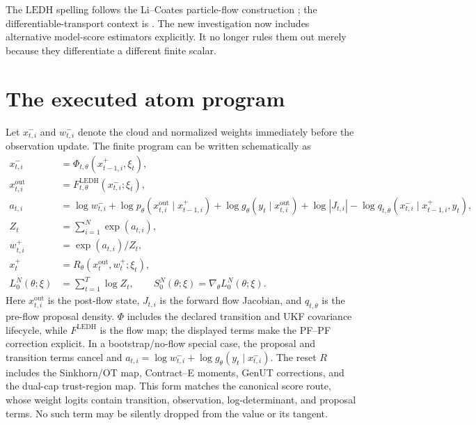 \documentclass[11pt]{article}
\newcommand{\LEDH}{\ensuremath{\mathrm{LEDH}}}
\newcommand{\GenUT}{\ensuremath{\mathrm{GenUT}}}
\newcommand{\OT}{\ensuremath{\mathrm{OT}}}
\begin{document}
The \LEDH{} spelling follows the Li--Coates particle-flow construction
\citep{li2017particle}; the differentiable-transport context is
\citet{corenflos2021differentiable}. The new investigation now includes
alternative model-score estimators explicitly. It no longer rules them out
merely because they differentiate a different finite scalar.


\section{The executed atom program}
\label{sec:atom}

Let $x_{t,i}^{-}$ and $w_{t,i}^{-}$ denote the cloud and normalized weights
immediately before the observation update.  The finite program can be written
schematically as
\begin{align}
 x_{t,i}^{-}
   &= \Phi_{t,\theta}(x_{t-1,i}^{+},\xi_t), \\
 x_{t,i}^{\mathrm{out}}
   &= F_{t,\theta}^{\mathrm{LEDH}}(x_{t,i}^{-};\xi_t), \\
 a_{t,i}
   &= \log w_{t,i}^{-}
      +\log p_\theta(x_{t,i}^{\mathrm{out}}\mid x_{t-1,i}^{+})
      +\log g_\theta(y_t\mid x_{t,i}^{\mathrm{out}})
      +\log |J_{t,i}|
      -\log q_{t,\theta}(x_{t,i}^{-}\mid x_{t-1,i}^{+},y_t), \\
 Z_t
   &= \sum_{i=1}^{N}\exp(a_{t,i}), \\
 w_{t,i}^{+}
   &= \exp(a_{t,i})/Z_t, \\
 x_t^{+}
   &= R_\theta(x_t^{\mathrm{out}},w_t^{+};\xi_t), \label{eq:atom-program}\\
 L_0^N(\theta;\xi)
   &= \sum_{t=1}^{T}\log Z_t,\qquad
 S_0^N(\theta;\xi)=\nabla_\theta L_0^N(\theta;\xi).
\end{align}
Here $x_{t,i}^{\mathrm{out}}$ is the post-flow state, $J_{t,i}$ is the
forward flow Jacobian, and $q_{t,\theta}$ is the pre-flow proposal density.
$\Phi$ includes the declared transition and UKF covariance lifecycle, while
$F^{\mathrm{LEDH}}$ is the flow map; the displayed terms make the PF--PF
correction explicit.  In a
bootstrap/no-flow special case, the proposal and transition terms cancel and
$a_{t,i}=\log w_{t,i}^{-}+\log g_\theta(y_t\mid x_{t,i}^{-})$.  The reset $R$
includes the Sinkhorn/\OT{} map, Contract--E moments, \GenUT{} corrections,
and the dual-cap trust-region map.  This form matches the canonical score
route, whose weight logits contain transition, observation, log-determinant,
and proposal terms.  No such term may be silently dropped from the value or
its tangent.
\end{document}
